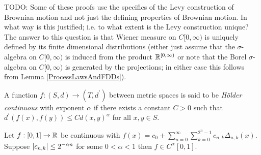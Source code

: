 TODO: Some of these proofs use the specifics of the Levy construction
of Brownian motion and not just the defining properties of Brownian
motion.  In what way is this justified; i.e. to what extent is the
Levy construction unique?  The answer to this question is that Wiener
measure on $C[0,\infty)$ is uniquely defined by its finite dimensional
distributions (either just assume that the $\sigma$-algebra on
$C[0,\infty)$ is induced from the product $\mathbb{R}^{[0,\infty)}$ or
note that the Borel $\sigma$-algebra on $C[0,\infty)$ is
generated by the projections; in either case this follows from Lemma \ref{ProcessLawsAndFDDs}).

\begin{defn}A function $f : (S, d) \to (T, d^\prime)$ between metric
  spaces is said to be \emph{H\"older continuous} with exponent
  $\alpha$ if there exists a constant $C > 0$ such that
  $d^\prime(f(x), f(y)) \leq C d(x,y)^\alpha$ for all $x, y \in S$.  
\end{defn}
\begin{lem}\label{HaarWaveletCoefficientHolderContinuity}Let $f : [0,1] \to \mathbb{R}$ be continuous with $f(x) = c_0 +
  \sum_{n=0}^\infty \sum_{k=0}^{2^n -1} c_{n,k} \Delta_{n,k}(x)$.  Suppose $\left \vert c_{n,k} \right \vert \leq
  2^{-\alpha n}$ for some $0 < \alpha < 1$ then $f \in C^{\alpha}[0,1]$.
\end{lem}
